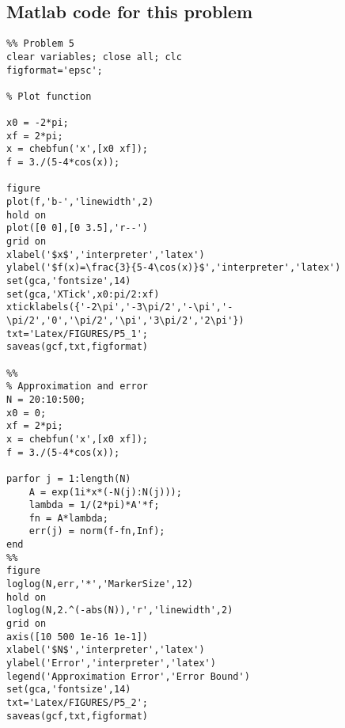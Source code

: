 \subsection*{Matlab code for this problem}\begin{verbatim}
%% Problem 5
clear variables; close all; clc
figformat='epsc';

% Plot function

x0 = -2*pi;
xf = 2*pi;
x = chebfun('x',[x0 xf]);
f = 3./(5-4*cos(x));

figure
plot(f,'b-','linewidth',2)
hold on
plot([0 0],[0 3.5],'r--')
grid on
xlabel('$x$','interpreter','latex')
ylabel('$f(x)=\frac{3}{5-4\cos(x)}$','interpreter','latex')
set(gca,'fontsize',14)
set(gca,'XTick',x0:pi/2:xf) 
xticklabels({'-2\pi','-3\pi/2','-\pi','-\pi/2','0','\pi/2','\pi','3\pi/2','2\pi'})
txt='Latex/FIGURES/P5_1';
saveas(gcf,txt,figformat)

%%
% Approximation and error
N = 20:10:500;
x0 = 0;
xf = 2*pi;
x = chebfun('x',[x0 xf]);
f = 3./(5-4*cos(x));

parfor j = 1:length(N)
    A = exp(1i*x*(-N(j):N(j)));
    lambda = 1/(2*pi)*A'*f;
    fn = A*lambda;
    err(j) = norm(f-fn,Inf);
end
%%
figure
loglog(N,err,'*','MarkerSize',12)
hold on
loglog(N,2.^(-abs(N)),'r','linewidth',2)
grid on
axis([10 500 1e-16 1e-1])
xlabel('$N$','interpreter','latex')
ylabel('Error','interpreter','latex')
legend('Approximation Error','Error Bound')
set(gca,'fontsize',14)
txt='Latex/FIGURES/P5_2';
saveas(gcf,txt,figformat)
\end{verbatim}